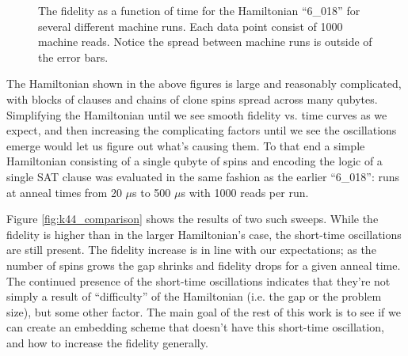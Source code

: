\begin{figure}
	\caption[Short Time Fidelities]{The fidelity as a function of time for the Hamiltonian ``6\_018'' for several different machine runs.  Each data point consist of 1000 machine reads.  Notice the spread between machine runs is outside of the error bars.}
	\label{fig:short_fidelity}
\end{figure}

The Hamiltonian shown in the above figures is large and reasonably complicated, with blocks of clauses and chains of clone spins spread across many qubytes.  Simplifying the Hamiltonian until we see smooth fidelity vs. time curves as we expect, and then increasing the complicating factors until we see the oscillations emerge would let us figure out what's causing them.  To that end a simple Hamiltonian consisting of a single qubyte of spins and encoding the logic of a single SAT clause was evaluated in the same fashion as the earlier ``6\_018'': runs at anneal times from 20 $\mu$s to 500 $\mu$s with 1000 reads per run.  

Figure \ref{fig:k44_comparison} shows the results of two such sweeps.  While the fidelity is higher than in the larger Hamiltonian's case, the short-time oscillations are still present.  The fidelity increase is in line with our expectations; as the number of spins grows the gap shrinks and fidelity drops for a given anneal time.  The continued presence of the short-time oscillations indicates that they're not simply a result of ``difficulty'' of the Hamiltonian (i.e. the gap or the problem size), but some other factor.
The main goal of the rest of this work is to see if we can create an embedding scheme that doesn't have this short-time oscillation, and how to increase the fidelity generally.

